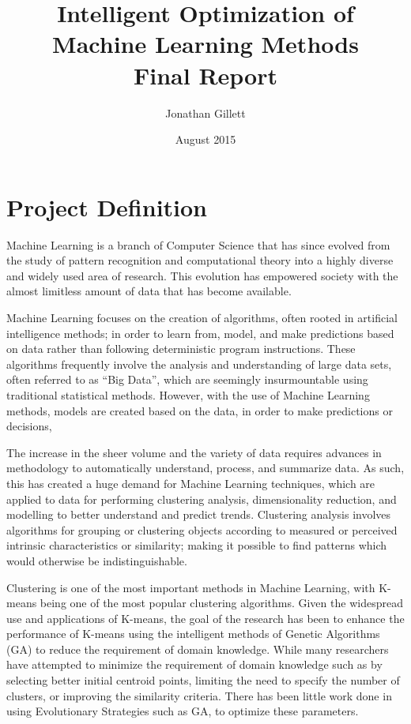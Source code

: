 \documentclass{article}
\title{Intelligent Optimization of Machine Learning Methods\\[0.8em]Final Report}
\author{Jonathan Gillett}
\date{August 2015}
\begin{document}
\maketitle


\section{Project Definition}

Machine Learning is a branch of Computer Science that has since evolved from the study of pattern recognition and computational theory into a highly diverse and widely used area of research. This evolution has empowered society with the almost limitless amount of data that has become available\cite{lohr2012age, mohri2012foundations}.

Machine Learning focuses on the creation of algorithms, often rooted in artificial intelligence methods; in order to learn from, model, and make predictions based on data rather than following deterministic program instructions\cite{dietterich2002machine, bishop2006pattern}. These algorithms frequently involve the analysis and understanding of large data sets, often referred to as ``Big Data'', which are seemingly insurmountable using traditional statistical methods\cite{lohr2012age}. However, with the use of Machine Learning methods, models are created based on the data, in order to make predictions or decisions, 

The increase in the sheer volume and the variety of data requires advances in methodology to automatically understand, process, and summarize data. As such, this has created a huge demand for Machine Learning techniques, which are applied to data for performing clustering analysis, dimensionality reduction, and modelling to better understand and predict trends. Clustering analysis involves algorithms for grouping or clustering objects according to measured or perceived intrinsic characteristics or similarity; making it possible to find patterns which would otherwise be indistinguishable\cite{jain2010}. 

Clustering is one of the most important methods in Machine Learning, with K-means being one of the most popular clustering algorithms. Given the widespread use and applications of K-means, the goal of the research has been to enhance the performance of K-means using the intelligent methods of Genetic Algorithms (GA) to reduce the requirement of domain knowledge. While many researchers have attempted to minimize the requirement of domain knowledge such as by selecting better initial centroid points\cite{meilua2006uniqueness}, limiting the need to specify the number of clusters\cite{tibshirani2001estimating}, or improving the similarity criteria\cite{kashima2008k}. There has been little work done in using Evolutionary Strategies such as GA, to optimize these parameters.
\end{document}
